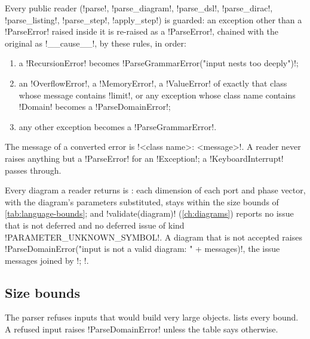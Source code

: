 Every public reader (\py!parse!, \py!parse_diagram!, \py!parse_dsl!, \py!parse_dirac!, \py!parse_listing!, \py!parse_step!, \py!apply_step!) is guarded: an exception other than a \py!ParseError! raised inside it is re-raised as a \py!ParseError!, chained with the original as \py!__cause__!, by these rules, in order:
\begin{enumerate}
\item a \py!RecursionError! becomes \code!ParseGrammarError("input nests too deeply")!;
\item an \py!OverflowError!, a \py!MemoryError!, a \py!ValueError! of exactly that class whose message contains \code!limit!, or any exception whose class name contains \code!Domain! becomes a \py!ParseDomainError!;
\item any other exception becomes a \py!ParseGrammarError!.
\end{enumerate}
The message of a converted error is \code!<class name>: <message>!. A reader never raises anything but a \py!ParseError! for an \py!Exception!; a \py!KeyboardInterrupt! passes through.

\begin{definition}\label{def:language-accepted}
Every diagram a reader returns is : each dimension of each port and phase vector, with the diagram's parameters substituted, stays within the size bounds of \cref{tab:language-bounds}; and \py!validate(diagram)! (\cref{ch:diagrams}) reports no issue that is not deferred and no deferred issue of kind \py!PARAMETER_UNKNOWN_SYMBOL!. A diagram that is not accepted raises \code!ParseDomainError("input is not a valid diagram: " + messages)!, the issue messages joined by \code!; !.
\end{definition}

\subsection{Size bounds}\label{sec:language-bounds}

The parser refuses inputs that would build very large objects.  lists every bound. A refused input raises \py!ParseDomainError! unless the table says otherwise.

